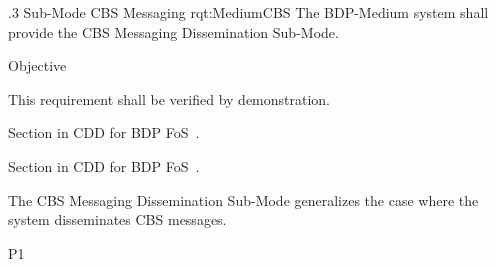 \ONERQMTVKPP
{\RqtNumberBase.3}
{Sub-Mode CBS Messaging}
{rqt:MediumCBS}
{The BDP-Medium system shall provide the CBS Messaging Dissemination Sub-Mode.}
{
	\item [Phase 1] Objective
}
{This requirement shall be verified by demonstration.}
{
\item [3.2.2] Section in CDD for BDP FoS~\cite{ref__BDP_FOS_CDD}.
\item [5.1.3] Section in CDD for BDP FoS~\cite{ref__BDP_FOS_CDD}.
}
{
	\item The CBS Messaging Dissemination Sub-Mode generalizes the case where the system disseminates CBS messages.
}
{P1}
